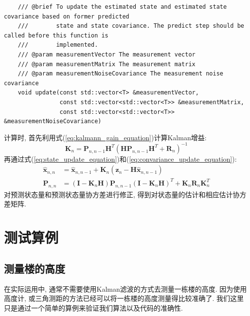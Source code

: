 \documentclass[12pt]{article}
\begin{document}
\begin{lstlisting}
    /// @brief To update the estimated state and estimated state covariance based on former predicted 
    ///        state and state covariance. The predict step should be called before this function is 
    ///        implemented.
    /// @param measurementVector The measurement vector
    /// @param measurementMatrix The measurement matrix
    /// @param measurementNoiseCovariance The measurement noise covariance
    void update(const std::vector<T> &measurementVector,
                const std::vector<std::vector<T>> &measurementMatrix,
                const std::vector<std::vector<T>> &measurementNoiseCovariance)
\end{lstlisting}

计算时, 首先利用式(\ref{eq:kalmann_gain_equation})计算Kalman增益:
\begin{equation*}
\bm{K}_n = \bm{P}_{n,n-1}\bm{H}^T(\bm{H}\bm{P}_{n,n-1}\bm{H}^T + \bm{R}_n)^{-1}
\end{equation*}
再通过式(\ref{eq:state_update_equation})和(\ref{eq:convariance_update_equation}):
\begin{equation*}
\begin{aligned}
\hat{\bm{x}}_{n,n} &= \hat{\bm{x}}_{n,n-1}+\bm{K}_n (\bm{z}_n - \bm{H}\hat{\bm{x}}_{n,n-1}) \\
\bm{P}_{n,n} &= (\bm{I} - \bm{K}_n \bm{H}) \bm{P}_{n,n-1} (\bm{I} - \bm{K}_n \bm{H})^T + \bm{K}_n \bm{R}_n \bm{K}_n^T
\end{aligned}
\end{equation*}
对预测状态量和预测状态量协方差进行修正, 得到对状态量的估计和相应估计协方差矩阵.

\section{测试算例}

\subsection{测量楼的高度}

在实际运用中, 通常不需要使用Kalman滤波的方式去测量一栋楼的高度. 因为使用高度计, 或三角测距的方法已经可以将一栋楼的高度测量得比较准确了. 我们这里只是通过一个简单的算例来验证我们算法以及代码的准确性. 
\end{document}
